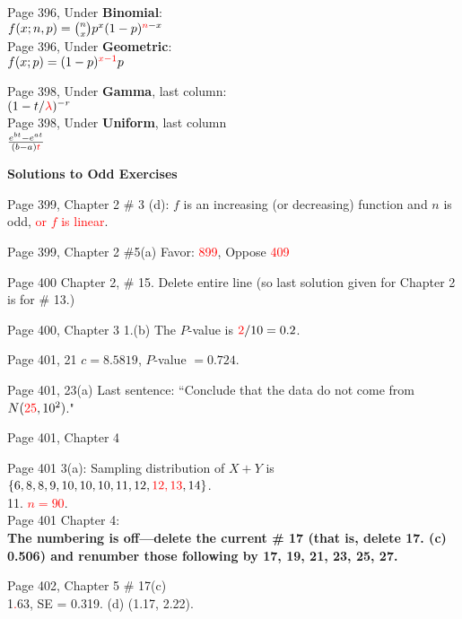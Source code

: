 \documentclass[11pt]{article}
\begin{document}
\bigskip %
Page 396, Under {\bf Binomial}:\\
$f(x; n, p) = \binom{n}{x}p^x (1-p)^{\textcolor{red}{n}-x}$\\

Page 396, Under {\bf Geometric}:\\
$f(x;  p)= (1-p)^{\textcolor{red}{x-1}}p$

\bigskip
Page 398, Under {\bf Gamma}, last column:\\
$(1-t/\textcolor{red}{\lambda})^{-r}$\\

Page 398, Under {\bf Uniform}, last column\\
$\frac{e^{bt}-e^{at}}{(b-a)\color{red}{t}}$



\newpage
{\bf Solutions to Odd Exercises}

\medskip

Page 399, Chapter 2 \# 3 (d):
$f$ is an increasing (or decreasing) function and $n$ is odd,
\textcolor{red}{or $f$ is linear}.

\bigskip
Page 399, Chapter 2 \#5(a) Favor: \textcolor{red}{899}, Oppose \textcolor{red}{409}


\bigskip
Page 400 Chapter 2, \# 15.  Delete entire line (so last solution given for
Chapter 2  is for \# 13.)


\bigskip
Page 400, Chapter 3
1.(b) The $P$-value is $\textcolor{red}{2}/10 = 0.2$.

\bigskip
Page 401, 21 $c=8.5819$, $P$-value $= 0.724$.

Page 401, 23(a) Last sentence: ``Conclude that the data do not come from $N(\textcolor{red}{25}, 10^2)$."

\bigskip
Page 401, Chapter 4

Page 401 3(a): Sampling distribution of $X+Y$ is
$\{6, 8, 8, 9, 10, 10, 10, 11, 12,\textcolor{red}{12, 13}, 14\}$.\\
11. \textcolor{red}{$n=90$}.\\

\bigskip
Page 401 Chapter 4: \\
{\bf
The numbering is off---delete the current \# 17 (that is, delete 17. (c) 0.506)
and renumber those following by 17, 19, 21, 23, 25, 27.}

\bigskip
Page 402, Chapter 5 \# 17(c) \\
1\textcolor{red}{.}63, SE = 0.319. (d) (1.17, 2.22).
\end{document}
